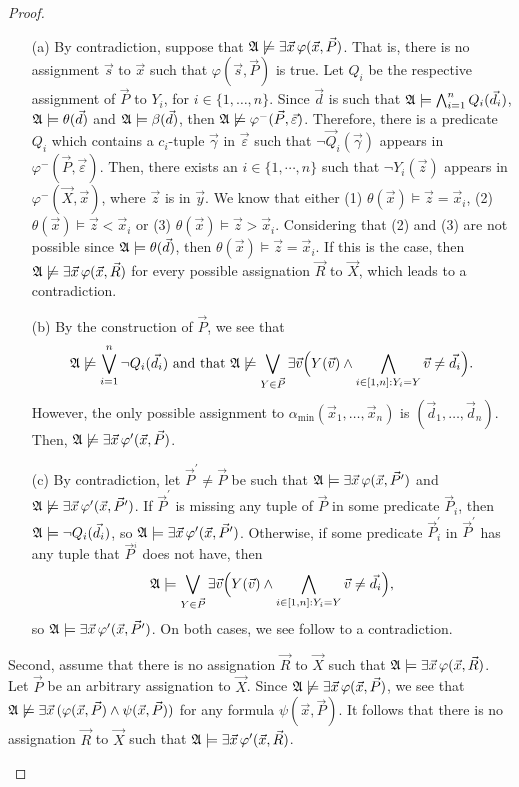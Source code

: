 \documentclass[12pt]{article}
\def\A{{\frak A}}
\def\P{\vec{P}}
\def\Q{\vec{Q}}
\def\R{\vec{R}}
\def\X{\vec{X}}
\def\d{\vec{d}} %
\def\s{\vec{s}}
\def\v{\vec{v}} %
\def\x{\vec{x}} %
\def\y{\vec{y}} %
\def\z{\vec{z}} %
\def\ep{\vec{\varepsilon}}
\def\ga{\vec{\gamma}}
\begin{document}
\begin{proof}
\begin{enumerate}
\begin{enumerate}
\item[(a)] By contradiction, suppose that $\A\not\models\exists\x\,\varphi(\x,\P)$. That is, there is no assignment $\s$ to $\x$ such that $\varphi(\s,\P)$ is true. Let $Q_i$ be the respective assignment of $\P$ to $Y_i$, for $i\in\{1,\dots,n\}$. Since $\d$ is such that $\A\models \bigwedge_{i=1}^n Q_i(\d_i)$, $\A\models\theta(\d)$ and  $\A\models\beta(\d)$, then $\A\not\models\varphi^{-}(\P,\ep)$. Therefore, there is a predicate $Q_i$ which contains a $c_i$-tuple $\ga$ in $\ep$ such that $\neg \Q_i(\ga)$ appears in $\varphi^{-}(\P,\ep)$. Then, there exists an $i\in\{1,\cdots,n\}$ such that $\neg Y_i(\z)$ appears in $\varphi^{-}(\X,\x)$, where $\z$ is in $\y$. We know that either (1) $\theta(\x)\models \z = \x_i$, (2) $\theta(\x)\models \z < \x_i$ or (3) $\theta(\x)\models \z > \x_i$. Considering that (2) and (3) are not possible since $\A\models\theta(\d)$, then $\theta(\x)\models \z = \x_i$. If this is the case, then $\A\not\models\exists\x\,\varphi(\x,\R)$ for every possible assignation $\R$ to $\X$, which leads to a contradiction.
\item[(b)] By the construction of $\P$, we see that 
$$\A\not\models\bigvee_{i = 1}^{n}\neg Q_i(\d_i) \text{ and that } \A\not\models\bigvee_{Y\in\P} \exists \v\Big( Y(\v) \wedge \bigwedge_{i\in[1,n]: Y_i = Y} \v \neq \d_i\Big).$$ However, the only possible assignment to $\alpha_{\min}(\x_1,\dots,\x_n)$ is $(\d_1,\dots,\d_n)$. Then, $\A\not\models\exists\x\,\varphi^\prime(\x,\P)$.
\item[(c)] By contradiction, let $\P^\prime \neq \P$ be such that $\A\models\exists\x\,\varphi(\x,\P^\prime)$ and $\A\not\models\exists\x\,\varphi^\prime(\x,\P^\prime)$. If $\P^\prime$ is missing any tuple of $\P$ in some predicate $\P_i$, then $\A\models \neg Q_i(\d_i)$, so $\A\models\exists\x\,\varphi^\prime(\x,\P^\prime)$. Otherwise, if some predicate $\P^\prime_i$ in $\P^\prime$ has any tuple that $\P^_i$ does not have, then $$\A\models\bigvee_{Y\in\P} \exists \v\Big( Y(\v) \wedge \bigwedge_{i\in[1,n]: Y_i = Y} \v \neq \d_i\Big),$$ so $\A\models\exists\x\,\varphi^\prime(\x,\P^\prime)$. On both cases, we see follow to a contradiction.
\end{enumerate}
Second, assume that there is no assignation $\R$ to $\X$ such that $\A\models\exists\x\,\varphi(\x,\R)$. Let $\P$ be an arbitrary assignation to $\X$. Since $\A\not\models\exists\x\,\varphi(\x,\P)$, we see that $\A\not\models\exists\x\,(\varphi(\x,\P)\wedge\psi(\x,\P))$ for any formula $\psi(\x,\P)$. It follows that there is no assignation $\R$ to $\X$ such that $\A\models\exists\x\,\varphi^\prime(\x,\R)$.


\end{enumerate}
\end{proof}
\end{document}
